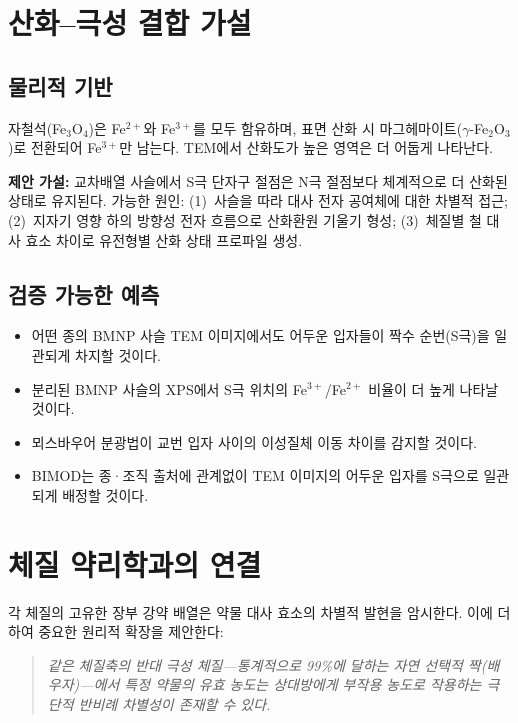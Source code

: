 \documentclass[12pt,a4paper]{article}
\begin{document}
\section{산화--극성 결합 가설}

\subsection{물리적 기반}
자철석(Fe$_3$O$_4$)은 Fe$^{2+}$와 Fe$^{3+}$를 모두 함유하며,
표면 산화 시 마그헤마이트($\gamma$-Fe$_2$O$_3$)로 전환되어 Fe$^{3+}$만 남는다.
TEM에서 산화도가 높은 영역은 더 어둡게 나타난다.

\textbf{제안 가설:} 교차배열 사슬에서 S극 단자구 절점은
N극 절점보다 체계적으로 더 산화된 상태로 유지된다.
가능한 원인:
(1)~사슬을 따라 대사 전자 공여체에 대한 차별적 접근;
(2)~지자기 영향 하의 방향성 전자 흐름으로 산화환원 기울기 형성;
(3)~체질별 철 대사 효소 차이로 유전형별 산화 상태 프로파일 생성.

\subsection{검증 가능한 예측}
\begin{itemize}
  \item 어떤 종의 BMNP 사슬 TEM 이미지에서도 어두운 입자들이
        짝수 순번(S극)을 일관되게 차지할 것이다.
  \item 분리된 BMNP 사슬의 XPS에서 S극 위치의
        Fe$^{3+}$/Fe$^{2+}$ 비율이 더 높게 나타날 것이다.
  \item 뫼스바우어 분광법이 교번 입자 사이의 이성질체 이동 차이를
        감지할 것이다.
  \item BIMOD는 종·조직 출처에 관계없이 TEM 이미지의 어두운 입자를
        S극으로 일관되게 배정할 것이다.
\end{itemize}

\section{체질 약리학과의 연결}

각 체질의 고유한 장부 강약 배열은 약물 대사 효소의 차별적 발현을 암시한다.
이에 더하여 중요한 원리적 확장을 제안한다:

\begin{quote}
\textit{같은 체질축의 반대 극성 체질---통계적으로 99\%에 달하는 자연 선택적 짝(배우자)---에서
특정 약물의 유효 농도는 상대방에게 부작용 농도로 작용하는
극단적 반비례 차별성이 존재할 수 있다.}
\end{quote}
\end{document}
